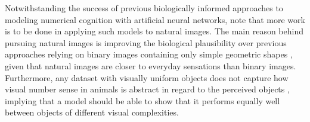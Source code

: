 \documentclass[twocolumn]{article}
\begin{document}
Notwithstanding the success of previous biologically informed approaches to modeling numerical cognition with artificial neural networks, \citet{stoianov2012} note that more work is to be done in applying such models to natural images. The main reason behind pursuing natural images is improving the biological plausibility over previous approaches relying on binary images containing only simple geometric shapes \citep[for examples, see][]{stoianov2012, wu2018two, peterson2000computational}, given that natural images are closer to everyday sensations than binary images. Furthermore, any dataset with visually uniform objects does not capture how visual number sense in animals is abstract in regard to the perceived objects \citep{nieder2016neuronal}, implying that a model should be able to show that it performs equally well between objects of different visual complexities.
\end{document}
